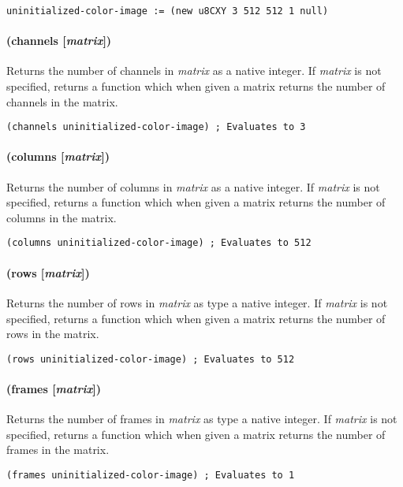 \documentclass[numbers=noenddot]{scrbook}
\begin{document}
\begin{verbatim}
uninitialized-color-image := (new u8CXY 3 512 512 1 null)
\end{verbatim}

\paragraph{(channels [\emph{matrix}])}
Returns the number of channels in \emph{matrix} as a native integer.
If \emph{matrix} is not specified, returns a function which when given a matrix returns the number of channels in the matrix.

\begin{verbatim}
(channels uninitialized-color-image) ; Evaluates to 3
\end{verbatim}

\paragraph{(columns [\emph{matrix}])}
Returns the number of columns in \emph{matrix} as a native integer.
If \emph{matrix} is not specified, returns a function which when given a matrix returns the number of columns in the matrix.

\begin{verbatim}
(columns uninitialized-color-image) ; Evaluates to 512
\end{verbatim}

\paragraph{(rows [\emph{matrix}])}
Returns the number of rows in \emph{matrix} as type a native integer.
If \emph{matrix} is not specified, returns a function which when given a matrix returns the number of rows in the matrix.

\begin{verbatim}
(rows uninitialized-color-image) ; Evaluates to 512
\end{verbatim}

\paragraph{(frames [\emph{matrix}])}
Returns the number of frames in \emph{matrix} as type a native integer.
If \emph{matrix} is not specified, returns a function which when given a matrix returns the number of frames in the matrix.

\begin{verbatim}
(frames uninitialized-color-image) ; Evaluates to 1
\end{verbatim}
\end{document}
